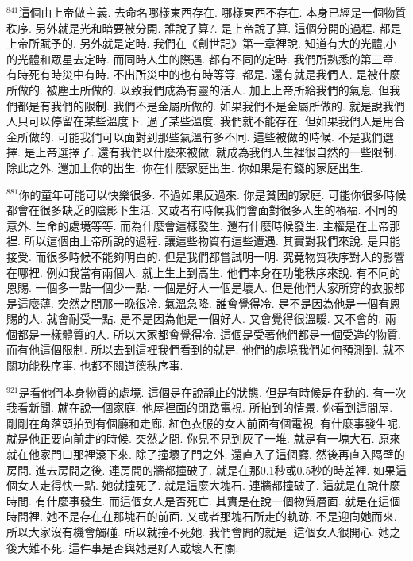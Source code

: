 \documentclass{book}
\begin{document}
$^{841}$這個由上帝做主義.
去命名哪樣東西存在.
哪樣東西不存在.
本身已經是一個物質秩序.
另外就是光和暗要被分開.
誰說了算?.
是上帝說了算.
這個分開的過程.
都是上帝所賦予的.
另外就是定時.
我們在《創世記》第一章裡說.
知道有大的光體,小的光體和眾星去定時.
而同時人生的際遇.
都有不同的定時.
我們所熟悉的第三章.
有時死有時災中有時.
不出所災中的也有時等等.
都是.
還有就是我們人.
是被什麼所做的.
被塵土所做的.
以致我們成為有靈的活人.
加上上帝所給我們的氣息.
但我們都是有我們的限制.
我們不是金屬所做的.
如果我們不是金屬所做的.
就是說我們人只可以停留在某些溫度下.
過了某些溫度.
我們就不能存在.
但如果我們人是用合金所做的.
可能我們可以面對到那些氣溫有多不同.
這些被做的時候.
不是我們選擇.
是上帝選擇了.
還有我們以什麼來被做.
就成為我們人生裡很自然的一些限制.
除此之外.
還加上你的出生.
你在什麼家庭出生.
你如果是有錢的家庭出生.

$^{881}$你的童年可能可以快樂很多.
不過如果反過來.
你是貧困的家庭.
可能你很多時候都會在很多缺乏的陰影下生活.
又或者有時候我們會面對很多人生的禍福.
不同的意外.
生命的處境等等.
而為什麼會這樣發生.
還有什麼時候發生.
主權是在上帝那裡.
所以這個由上帝所說的過程.
讓這些物質有這些遭遇.
其實對我們來說.
是只能接受.
而很多時候不能夠明白的.
但是我們都嘗試明一明.
究竟物質秩序對人的影響在哪裡.
例如我當有兩個人.
就上生上到高生.
他們本身在功能秩序來說.
有不同的恩賜.
一個多一點一個少一點.
一個是好人一個是壞人.
但是他們大家所穿的衣服都是這麼薄.
突然之間那一晚很冷.
氣溫急降.
誰會覺得冷.
是不是因為他是一個有恩賜的人.
就會耐受一點.
是不是因為他是一個好人.
又會覺得很溫暖.
又不會的.
兩個都是一樣體質的人.
所以大家都會覺得冷.
這個是受著他們都是一個受造的物質.
而有他這個限制.
所以去到這裡我們看到的就是.
他們的處境我們如何預測到.
就不關功能秩序事.
也都不關道德秩序事.

$^{921}$是看他們本身物質的處境.
這個是在說靜止的狀態.
但是有時候是在動的.
有一次我看新聞.
就在說一個家庭.
他屋裡面的閉路電視.
所拍到的情景.
你看到這間屋.
剛剛在角落頭拍到有個廳和走廊.
紅色衣服的女人前面有個電視.
有什麼事發生呢.
就是他正要向前走的時候.
突然之間.
你見不見到灰了一堆.
就是有一塊大石.
原來就在他家門口那裡滾下來.
除了撞壞了門之外.
還直入了這個廳.
然後再直入隔壁的房間.
進去房間之後.
連房間的牆都撞破了.
就是在那0.1秒或0.5秒的時差裡.
如果這個女人走得快一點.
她就撞死了.
就是這麼大塊石.
連牆都撞破了.
這就是在說什麼時間.
有什麼事發生.
而這個女人是否死亡.
其實是在說一個物質層面.
就是在這個時間裡.
她不是存在在那塊石的前面.
又或者那塊石所走的軌跡.
不是迎向她而來.
所以大家沒有機會觸碰.
所以就撞不死她.
我們會問的就是.
這個女人很開心.
她之後大難不死.
這件事是否與她是好人或壞人有關.
\end{document}
